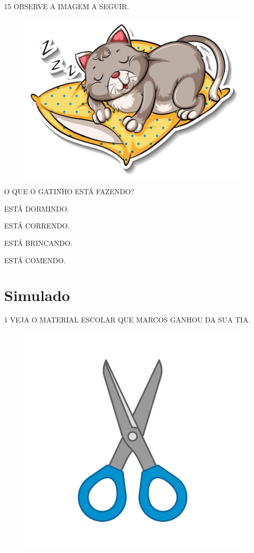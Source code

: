 \num{15} OBSERVE A IMAGEM A SEGUIR.

\begin{figure}[H]
\centering
\includegraphics[width=.7\textwidth]{./media/image229.jpg}
\end{figure}

O QUE O GATINHO ESTÁ FAZENDO?

\begin{escolha}

\item ESTÁ DORMINDO.

\item ESTÁ CORRENDO.

\item ESTÁ BRINCANDO.

\item ESTÁ COMENDO.

\end{escolha}

\chapter[Simulado 3]{Simulado}

\num{1} VEJA O MATERIAL ESCOLAR QUE MARCOS GANHOU DA SUA TIA.

\begin{figure}[H]
\centering
\includegraphics[width=.7\textwidth]{./media/image230.png}
\end{figure}

